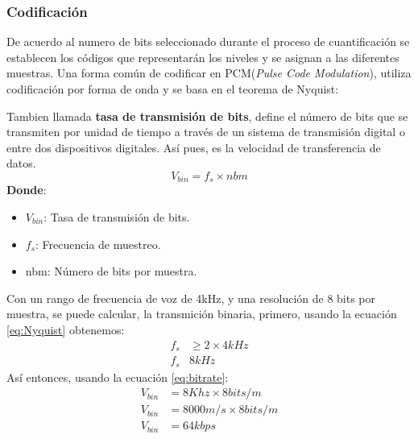 \documentclass[
	12pt, %
	fleqn, %
	a4paper, %
	oneside, %
]{LegrandOrangeBook}
\begin{document}
\subsubsection{Codificación}
De acuerdo al numero de bits seleccionado durante el proceso de cuantificación se establecen los códigos que representarán los niveles y se asignan a las diferentes muestras.
Una forma común de codificar en PCM(\textit{Pulse Code Modulation}), utiliza codificación por forma de onda y se basa en el teorema de Nyquist:
\begin{definition}
Tambien llamada \textbf{tasa de transmisión de bits},  define el número de bits que se transmiten por unidad de tiempo a través de un sistema de transmisión digital o entre dos dispositivos digitales. Así pues, es la velocidad de transferencia de datos.
\begin{equation}\label{eq:bitrate}
V_{bin}=f_s\times nbm
\end{equation}
\textbf{Donde}:
\begin{itemize}
\item $V_{bin}$: Tasa de transmisión de bits.
\item $f_s$: Frecuencia de muestreo.
\item nbm: Número de bits por muestra.
\end{itemize}
\end{definition}
\begin{example}
Con un rango de frecuencia de voz de 4kHz, y una resolución de 8 bits por muestra, se puede calcular, la transmición binaria, primero, usando la ecuación \ref{eq:Nyquist} obtenemos:
\begin{equation}
\begin{split}
f_s&\geq 2\times 4kHz\\
f_s&8kHz
\end{split}
\end{equation}
Así entonces, usando la ecuación \ref{eq:bitrate}:
\begin{equation}
\begin{split}
V_{bin}&=8Khz\times 8 bits/m\\
V_{bin}&=8000m/s \times 8bits/m\\
V_{bin}&=64kbps
\end{split}
\end{equation}
\end{example}
\end{document}
